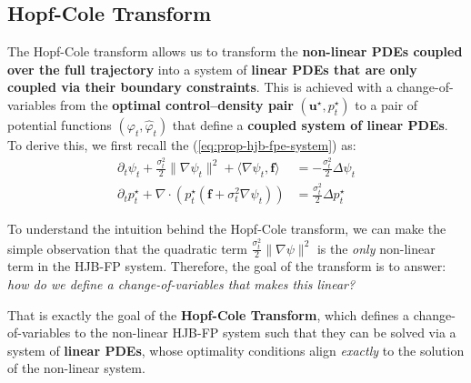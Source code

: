 \documentclass{article}
\newcommand{\boldtext}[1]{\textbf{\textcolor{MyGreen}{#1}}}
\begin{document}
\subsection{Hopf-Cole Transform}
\label{subsec:hopf-cole-transform}
The Hopf-Cole transform allows us to transform the \textbf{non-linear PDEs coupled over the full trajectory} into a system of \textbf{linear PDEs that are only coupled via their boundary constraints}. This is achieved with a change-of-variables from the \textbf{optimal control–density pair} $(\boldsymbol{u}^\star, p^\star_t)$ to a pair of potential functions $(\varphi_t, \hat\varphi_t)$ that define a \textbf{coupled system of linear PDEs}. To derive this, we first recall the (\ref{eq:prop-hjb-fpe-system}) as:
\begin{align}
        \partial_t\psi_t+\frac{\sigma_t^2}{2}\|\nabla \psi_t\|^2+\langle\nabla \psi_t, \boldsymbol{f}\rangle&=-\frac{\sigma^2_t}{2}\Delta \psi_t\tag{HJB Equation}\label{eq:hjb-system}\\
        \partial_t p_t^\star+\nabla\cdot (p_t^\star(\boldsymbol{f}+\sigma^2_t\nabla \psi_t))&=\frac{\sigma^2_t}{2}\Delta p^\star_t\tag{FP Equation}\label{eq:fpe-system}
\end{align}

To understand the intuition behind the Hopf-Cole transform, we can make the simple observation that the quadratic term $\frac{\sigma_t^2}{2}\|\nabla \psi\|^2$ is the \textit{only} non-linear term in the HJB-FP system. Therefore, the goal of the transform is to answer: \textit{how do we define a change-of-variables that makes this linear?}

That is exactly the goal of the \boldtext{Hopf-Cole Transform}, which defines a change-of-variables to the non-linear HJB-FP system such that they can be solved via a system of \textbf{linear PDEs}, whose optimality conditions align \textit{exactly} to the solution of the non-linear system.
\end{document}
